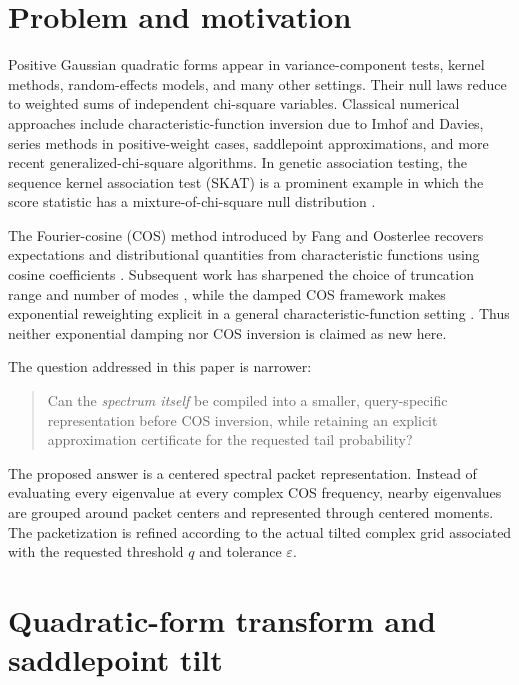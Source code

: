 \documentclass[11pt]{article}
\theoremstyle{definition}
\newcommand{\eps}{\varepsilon}
\begin{document}
\section{Problem and motivation}

Positive Gaussian quadratic forms appear in variance-component tests, kernel methods, random-effects models, and many other settings. Their null laws reduce to weighted sums of independent chi-square variables. Classical numerical approaches include characteristic-function inversion due to Imhof and Davies, series methods in positive-weight cases, saddlepoint approximations, and more recent generalized-chi-square algorithms. In genetic association testing, the sequence kernel association test (SKAT) is a prominent example in which the score statistic has a mixture-of-chi-square null distribution \cite{Wu2011}.

The Fourier-cosine (COS) method introduced by Fang and Oosterlee recovers expectations and distributional quantities from characteristic functions using cosine coefficients \cite{FangOosterlee2008}. Subsequent work has sharpened the choice of truncation range and number of modes \cite{Junike2024}, while the damped COS framework makes exponential reweighting explicit in a general characteristic-function setting \cite{JunikeStier2025}. Thus neither exponential damping nor COS inversion is claimed as new here.

The question addressed in this paper is narrower:
\begin{quote}
Can the \emph{spectrum itself} be compiled into a smaller, query-specific representation before COS inversion, while retaining an explicit approximation certificate for the requested tail probability?
\end{quote}

The proposed answer is a centered spectral packet representation. Instead of evaluating every eigenvalue at every complex COS frequency, nearby eigenvalues are grouped around packet centers and represented through centered moments. The packetization is refined according to the actual tilted complex grid associated with the requested threshold $q$ and tolerance $\eps$.

\section{Quadratic-form transform and saddlepoint tilt}
\end{document}
